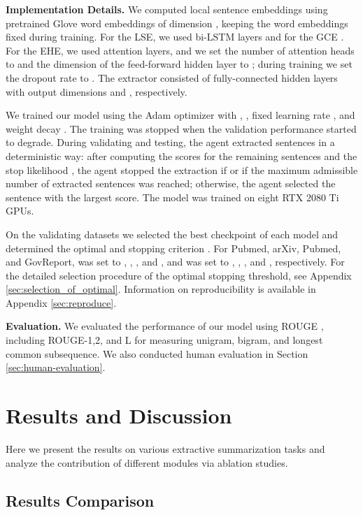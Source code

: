 \documentclass[11pt]{article}
\begin{document}
\noindent\textbf{Implementation Details.} 
We computed local sentence embeddings using pretrained Glove word embeddings \cite{pennington2014glove} of dimension , keeping the word embeddings fixed during training. For the LSE, we used  bi-LSTM layers and for the GCE . For the EHE, we used  attention layers, and we set the number of attention heads to  and the dimension of the feed-forward hidden layer to ; during training we set the dropout rate to . The extractor consisted of  fully-connected hidden layers with output dimensions  and , respectively. 


We trained our model using the Adam optimizer with ,  \cite{DBLP:journals/corr/KingmaB14}, fixed learning rate , and weight decay . 
The training was stopped when the validation performance started to degrade.
During validating and testing, the agent extracted sentences in a deterministic way: after computing the scores  for the remaining sentences and the stop likelihood , the agent stopped the extraction if  or if the maximum admissible number  of extracted sentences was reached; otherwise, the agent selected the sentence with the largest score. The model was trained on eight RTX 2080 Ti GPUs. 

On the validating datasets we selected the best checkpoint of each model and determined the optimal  and stopping criterion . For Pubmed, arXiv, Pubmed, and GovReport,  was set to , , , and , and   was set to , , , and , respectively. For the detailed selection procedure of the optimal stopping threshold, see Appendix \ref{sec:selection_of_optimal}. Information on reproducibility is available in Appendix \ref{sec:reproduce}.

\noindent\textbf{Evaluation.} We evaluated the performance of our model using  ROUGE \cite{lin2004rouge}, including ROUGE-1,2, and L for measuring unigram, bigram, and longest common subsequence. We also conducted human evaluation in Section \ref{sec:human-evaluation}.


\section{Results and Discussion}
Here we present the results on various extractive summarization tasks and analyze the contribution of different modules via ablation studies.
\subsection{Results Comparison}
\end{document}
